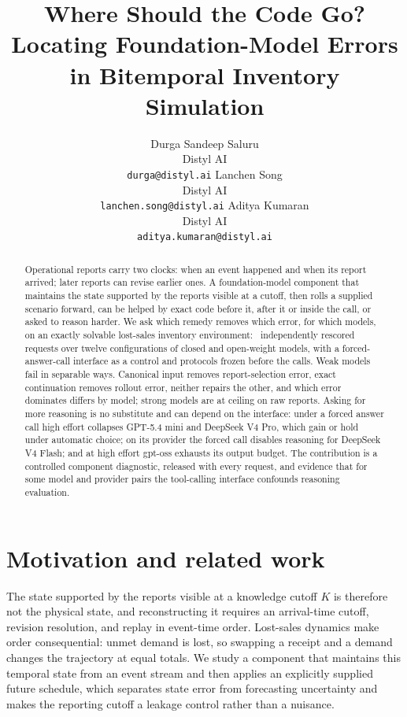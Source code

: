 \documentclass{article}
\title{Where Should the Code Go?\\Locating Foundation-Model Errors in Bitemporal Inventory Simulation}
\author{Durga Sandeep Saluru\\
Distyl AI\\
\texttt{durga@distyl.ai}
\And
Lanchen Song\\
Distyl AI\\
\texttt{lanchen.song@distyl.ai}
\And
Aditya Kumaran\\
Distyl AI\\
\texttt{aditya.kumaran@distyl.ai}}
\begin{document}
\maketitle
\begin{abstract}
Operational reports carry two clocks: when an event happened and when its report arrived;
later reports can revise earlier ones. A foundation-model component that maintains the
state supported by the reports visible at a cutoff, then rolls a supplied scenario forward,
can be helped by exact code before it, after it or inside the call, or asked to reason harder. We ask
which remedy removes which error, for which models, on an exactly solvable lost-sales
inventory environment: \TotalRequests\ independently rescored requests over twelve
configurations of closed and open-weight models, with a forced-answer-call interface as a
control and protocols frozen before the calls. Weak models fail in separable ways. Canonical input removes
report-selection error, exact continuation removes rollout error, neither repairs the other,
and which error dominates differs by model; strong models are at ceiling on raw reports.
Asking for more reasoning is no substitute and can depend on the interface: under a forced
answer call high effort collapses GPT-5.4 mini and DeepSeek V4 Pro, which gain or hold under
automatic choice; on its provider the forced call disables reasoning for DeepSeek V4 Flash;
and at high effort gpt-oss exhausts its output budget. The contribution is a controlled
component diagnostic, released with every request, and evidence that for some model and
provider pairs the tool-calling interface confounds reasoning evaluation.
\end{abstract}

\section{Motivation and related work}
The state supported by the reports visible at a knowledge cutoff $K$ is
therefore not the physical state, and reconstructing it requires an arrival-time cutoff,
revision resolution, and replay in event-time order. Lost-sales dynamics make order
consequential: unmet demand is lost, so swapping a receipt and a demand changes the
trajectory at equal totals. We study a component that maintains this temporal state from an
event stream and then applies an explicitly supplied future schedule, which separates state
error from forecasting uncertainty and makes the reporting cutoff a leakage control rather
than a nuisance.
\end{document}
